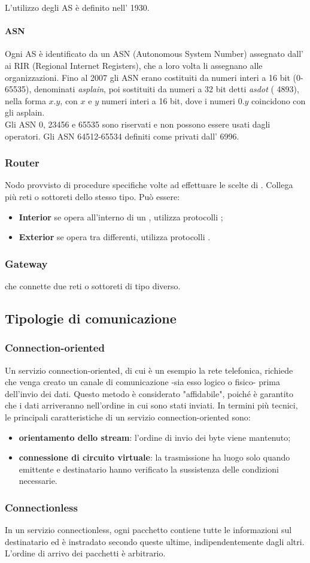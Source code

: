 \documentclass[a4paper,11pt]{article}
\def\sub#1{\subsection{#1}\label{#1}}
\def\subsub#1{\subsubsection{#1}\label{#1}}
\def\para#1{\paragraph{#1}\label{#1}}
\def\vedi#1{\nameref{#1}}
\def\italic#1{\textit{#1}}
\begin{document}
L'utilizzo degli AS è definito nell'\vedi{RFC} 1930.
\para{ASN} Ogni AS è identificato da un ASN (Autonomous System Number) assegnato dall'\vedi{ICANN} ai RIR (Regional Internet Registers), che a loro volta li assegnano alle organizzazioni. 
Fino al 2007 gli ASN erano costituiti da numeri interi
a 16 bit (0-65535), denominati \textit{asplain}, poi sostituiti da numeri a 32 bit detti \italic{asdot} (\vedi{RFC} 4893),
nella forma $x.y$, con $x$ e $y$ numeri interi a 16 bit, dove i numeri $0.y$ coincidono con gli asplain.\\ %
Gli ASN 0, 23456 e 65535 sono riservati e non possono
essere usati dagli operatori.
Gli ASN 64512-65534 definiti come privati dall'\vedi{RFC} 
6996. %
\subsub{Router}
Nodo provvisto di procedure specifiche volte ad effettuare le scelte di \vedi{Routing}. Collega più reti o sottoreti dello stesso tipo. Può essere:
\begin{itemize}
\item \textbf{Interior} se opera all'interno di un \vedi{AS}, utilizza protocolli \vedi{IGP};
\item \textbf{Exterior} se opera tra \vedi{AS} differenti, utilizza protocolli \vedi{EGP}.
\end{itemize}
\subsub{Gateway} 
\vedi{Router} che connette due reti o sottoreti di tipo diverso.
\sub{Tipologie di comunicazione}
\subsub{Connection-oriented} 
Un servizio connection-oriented, di cui è un esempio la rete telefonica, richiede che venga creato un canale di comunicazione -sia esso logico o fisico- prima dell'invio dei dati. Questo metodo è considerato "affidabile", poiché è garantito che i dati arriveranno nell'ordine in cui sono stati inviati. In termini più tecnici, le principali caratteristiche di un servizio connection-oriented sono:
\begin{itemize}
\item \textbf{orientamento dello stream}: l'ordine di invio dei byte viene mantenuto;
\item \textbf{connessione di circuito virtuale}: la trasmissione ha luogo solo quando emittente e destinatario hanno verificato la sussistenza delle condizioni necessarie.
\end{itemize}
\subsub{Connectionless}
In un servizio connectionless, ogni pacchetto contiene tutte le informazioni sul destinatario ed è instradato secondo queste ultime, indipendentemente dagli altri. L'ordine di arrivo dei pacchetti è arbitrario.
\end{document}
